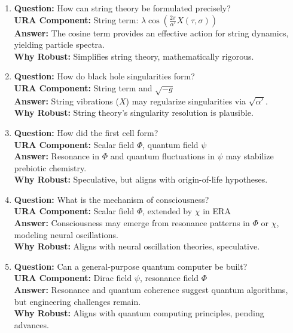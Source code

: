 \documentclass[12pt]{article}
\begin{document}
\begin{enumerate}
    \item \textbf{Question:} How can string theory be formulated precisely? \\
    \textbf{URA Component:} String term: \(\lambda \cos\left( \frac{2\pi}{\alpha'} X(\tau,\sigma) \right)\) \\
    \textbf{Answer:} The cosine term provides an effective action for string dynamics, yielding particle spectra. \\
    \textbf{Why Robust:} Simplifies string theory, mathematically rigorous.

    \item \textbf{Question:} How do black hole singularities form? \\
    \textbf{URA Component:} String term and \(\sqrt{-g}\) \\
    \textbf{Answer:} String vibrations (\(X\)) may regularize singularities via \(\sqrt{\alpha'}\). \\
    \textbf{Why Robust:} String theory’s singularity resolution is plausible.

    \item \textbf{Question:} How did the first cell form? \\
    \textbf{URA Component:} Scalar field \(\Phi\), quantum field \(\psi\) \\
    \textbf{Answer:} Resonance in \(\Phi\) and quantum fluctuations in \(\psi\) may stabilize prebiotic chemistry. \\
    \textbf{Why Robust:} Speculative, but aligns with origin-of-life hypotheses.

    \item \textbf{Question:} What is the mechanism of consciousness? \\
    \textbf{URA Component:} Scalar field \(\Phi\), extended by \(\chi\) in ERA \\
    \textbf{Answer:} Consciousness may emerge from resonance patterns in \(\Phi\) or \(\chi\), modeling neural oscillations. \\
    \textbf{Why Robust:} Aligns with neural oscillation theories, speculative.

    \item \textbf{Question:} Can a general-purpose quantum computer be built? \\
    \textbf{URA Component:} Dirac field \(\psi\), resonance field \(\Phi\) \\
    \textbf{Answer:} Resonance and quantum coherence suggest quantum algorithms, but engineering challenges remain. \\
    \textbf{Why Robust:} Aligns with quantum computing principles, pending advances.
\end{enumerate}
\end{document}
